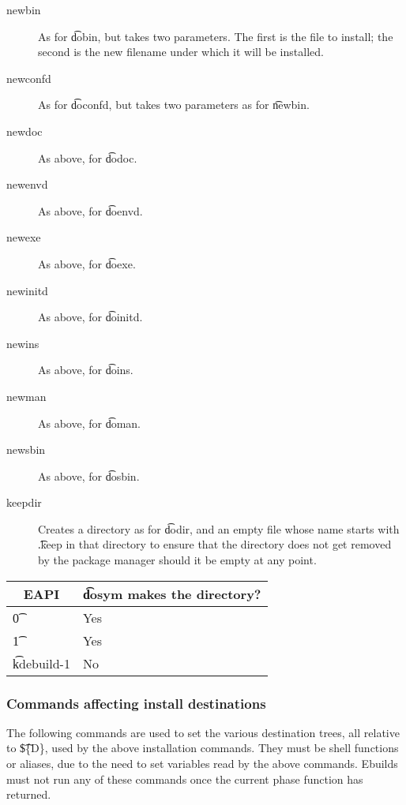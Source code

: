 \begin{description}
\item[newbin] As for \t{dobin}, but takes two parameters. The first is the file to install; the
    second is the new filename under which it will be installed.

\item[newconfd] As for \t{doconfd}, but takes two parameters as for \t{newbin}.

\item[newdoc] As above, for \t{dodoc}.

\item[newenvd] As above, for \t{doenvd}.

\item[newexe] As above, for \t{doexe}.

\item[newinitd] As above, for \t{doinitd}.

\item[newins] As above, for \t{doins}.

\item[newman] As above, for \t{doman}.

\item[newsbin] As above, for \t{dosbin}.

\item[keepdir] Creates a directory as for \t{dodir}, and an empty file whose name starts with
    \t{.keep} in that directory to ensure that the directory does not get removed by the
    package manager should it be empty at any point.

\end{description}

\IFKDEBUILDELSE
{
    \begin{table}
    \centering
     \label{dosym-table}
    \begin{tabular}{ l l }
        \toprule
        \multicolumn{1}{c}{\textbf{EAPI}} &
        \multicolumn{1}{c}{\textbf{\t{dosym} makes the directory?}} \\
        \midrule
    \t{0} & Yes \\
    \t{1} & Yes \\
    \t{kdebuild-1} & No \\
    \bottomrule
    \end{tabular}
    \end{table}
}{
}

\subsubsection{Commands affecting install destinations}
The following commands are used to set the various destination trees, all relative to \t{\$\{D\}},
used by the above installation commands. They must be shell functions or aliases, due to the need to
set variables read by the above commands. Ebuilds must not run any of these commands once the
current phase function has returned.

